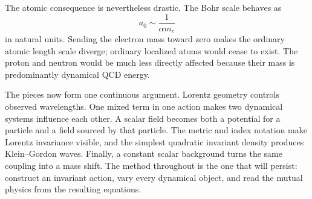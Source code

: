 \begin{classroomqa}
\end{classroomqa}

\begin{classroomqa}
\end{classroomqa}

\begin{classroomqa}
\end{classroomqa}

The atomic consequence is nevertheless drastic.  The Bohr scale behaves as
\begin{equation}
a_0\sim\frac{1}{\alpha m_e}
\end{equation}
in natural units.  Sending the electron mass toward zero makes the ordinary
atomic length scale diverge; ordinary localized atoms would cease to exist.
The proton and neutron would be much less directly affected because their
mass is predominantly dynamical QCD energy.

The pieces now form one continuous argument.  Lorentz
geometry controls observed wavelengths.  One mixed term in one action makes
two dynamical systems influence each other.  A scalar field becomes both a
potential for a particle and a field sourced by that particle.  The metric
and index notation make Lorentz invariance visible, and the simplest
quadratic invariant density produces Klein--Gordon waves.  Finally, a
constant scalar background turns the same coupling into a mass shift.  The
method throughout is the one that will persist: construct an invariant
action, vary every dynamical object, and read the mutual physics from the
resulting equations.
